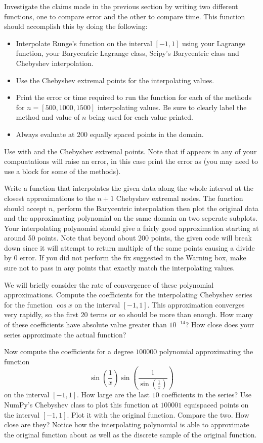 Investigate the claims made in the previous section by writing two different functions, one to compare error and the other to compare time.
This function should accomplish this by doing the following:
\begin{itemize}
\item Interpolate Runge's function on the interval $[-1,1]$ using your Lagrange function, your Barycentric Lagrange class, Scipy's Barycentric class and Chebyshev interpolation.
\item Use the Chebyshev extremal points for the interpolating values.
\item Print the error or time required to run the function for each of the methods for $n=[500,1000,1500]$ interpolating values.
Be sure to clearly label the method and value of $n$ being used for each value printed.
\item Always evaluate at 200 equally spaced points in the domain.
\end{itemize}
Use  with  and the Chebyshev extremal points.
Note that if  appears in any of your compuatations  will raise an error, in this case print the error as  (you may need to use a   block for some of the methods).

Write a function that interpolates the given data along the whole interval at the closest approximations to the $n+1$ Chebyshev extremal nodes.
The function should accept $n$, perform the Barycentric interpolation then plot the original data and the approximating polynomial on the same domain on two seperate subplots.
Your interpolating polynomial should give a fairly good approximation starting at around 50 points.
Note that beyond about 200 points, the given code will break down since it will attempt to return multiple of the same points causing a divide by 0 error.
If you did not perform the fix suggested in the Warning box, make sure not to pass in any points that exactly match the interpolating values.

\label{prob:cheb_interpolations}
We will briefly consider the rate of convergence of these polynomial approximations.
Compute the coefficients for the interpolating Chebyshev series for the function $\cos x$ on the interval $[-1, 1]$.
This approximation converges very rapidly, so the first $20$ terms or so should be more than enough.
How many of these coefficients have absolute value greater than $10^{-14}$?
How close does your series approximate the actual function?

Now compute the coefficients for a degree $100000$ polynomial approximating the function
\[\sin \left( \frac{1}{x} \right) \sin \left( \frac{1}{\sin \left( \frac{1}{x} \right)} \right) \]
on the interval $[-1, 1]$.
How large are the last $10$ coefficients in the series?
Use NumPy's Chebyshev class to plot this function at $100001$ equispaced points on the interval $[-1, 1]$.
Plot it with the original function.
Compare the two.
How close are they?
Notice how the interpolating polynomial is able to approximate the original function about as well as the discrete sample of the original function.
